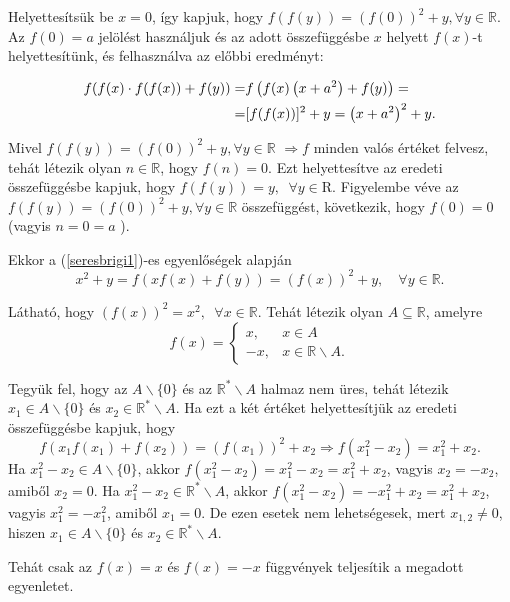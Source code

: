 \begin{solution}
	Helyettesítsük be $x=0$, így kapjuk, hogy $f(f(y))=(f(0))^{2}+y,\forall y\in\mathbb{R}$.
	Az $f(0)=a$ jelölést használjuk és az adott összefüggésbe $x$ helyett
	$f(x)$-t helyettesítünk, és felhasználva az előbbi eredményt:
	
	\begin{equation}
		\centering\begin{aligned}f(f(x)\cdot f(f(x))+f(y))= & f\left(f(x)\left(x+a^{2}\right)+f(y)\right)=\\
			= & {[f(f(x))]^{2}+y=\left(x+a^{2}\right)^{2}+y.}
		\end{aligned}
		\label{seresbrigi1}
	\end{equation}
	
	Mivel $f(f(y))=(f(0))^{2}+y,\forall y\in\mathbb{R}$ $\Rightarrow f$
	minden valós értéket felvesz, tehát létezik olyan $n\in\mathbb{R}$,
	hogy $f(n)=0$. Ezt helyettesítve az eredeti összefüggésbe kapjuk,
	hogy $f(f(y))=y,\phantom{a}\forall y\in\mathrm{R}$. Figyelembe véve
	az $f(f(y))=(f(0))^{2}+y,\forall y\in\mathbb{R}$ összefüggést, következik,
	hogy $f(0)=0$ (vagyis $n=0=a$ ).
	
	Ekkor a (\ref{seresbrigi1})-es egyenlőségek alapján 
	\[
	x^{2}+y=f(xf(x)+f(y))=(f(x))^{2}+y,\quad\forall y\in\mathbb{R}.
	\]
	
	Látható, hogy $(f(x))^{2}=x^{2},\phantom{a}\forall x\in\mathbb{R}$.
	Tehát létezik olyan $A\subseteq\mathbb{R}$, amelyre 
	\[
	f(x)=\left\{ \begin{array}{cc}
		x, & x\in A\\
		-x, & x\in\mathbb{R}\backslash A.
	\end{array}\right.
	\]
	
	Tegyük fel, hogy az $A\backslash\{0\}$ és az $\mathbb{R}^{*}\backslash A$
	halmaz nem üres, tehát létezik $x_{1}\in A\backslash\{0\}$ és $x_{2}\in\mathbb{R}^{*}\backslash A$.
	Ha ezt a két értéket helyettesítjük az eredeti összefüggésbe kapjuk,
	hogy 
	\[
	f(x_{1}f(x_{1})+f(x_{2}))=(f(x_{1}))^{2}+x_{2}\Rightarrow f\left(x_{1}^{2}-x_{2}\right)=x_{1}^{2}+x_{2}.
	\]
	Ha $x_{1}^{2}-x_{2}\in A\backslash\{0\}$, akkor $f\left(x_{1}^{2}-x_{2}\right)=x_{1}^{2}-x_{2}=x_{1}^{2}+x_{2}$,
	vagyis $x_{2}=-x_{2}$, amiből $x_{2}=0$. Ha $x_{1}^{2}-x_{2}\in\mathbb{R}^{*}\backslash A$,
	akkor $f\left(x_{1}^{2}-x_{2}\right)=-x_{1}^{2}+x_{2}=x_{1}^{2}+x_{2}$,
	vagyis $x_{1}^{2}=-x_{1}^{2}$, amiből $x_{1}=0$. De ezen esetek
	nem lehetségesek, mert $x_{1,2}\neq0$, hiszen $x_{1}\in A\backslash\{0\}$
	és $x_{2}\in\mathbb{R}^{*}\backslash A$.
	
	Tehát csak az $f(x)=x$ és $f(x)=-x$ függvények teljesítik a megadott
	egyenletet.
\end{solution}
